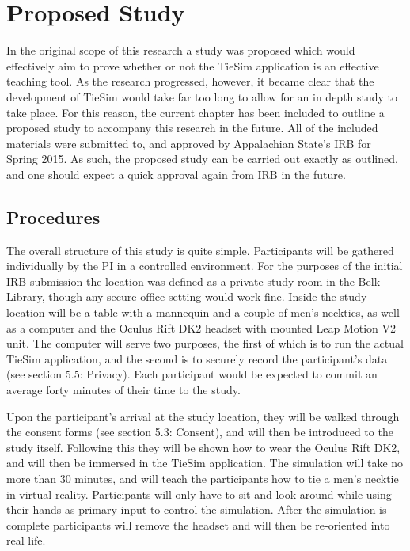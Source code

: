 \chapter{Proposed Study}
\label{chap:study}

In the original scope of this research a study was proposed which would effectively aim to prove whether or not the TieSim application is an effective teaching tool. As the research progressed, however, it became clear that the development of TieSim would take far too long to allow for an in depth study to take place. For this reason, the current chapter has been included to outline a proposed study to accompany this research in the future. All of the included materials were submitted to, and approved by Appalachian State's IRB for Spring 2015. As such, the proposed study can be carried out exactly as outlined, and one should expect a quick approval again from IRB in the future.

\section{Procedures}
\label{sec:procedures}

The overall structure of this study is quite simple. Participants will be gathered individually by the PI in a controlled environment. For the purposes of the initial IRB submission the location was defined as a private study room in the Belk Library, though any secure office setting would work fine. Inside the study location will be a table with a mannequin and a couple of men's neckties, as well as a computer and the Oculus Rift DK2 headset with mounted Leap Motion V2 unit. The computer will serve two purposes, the first of which is to run the actual TieSim application, and the second is to securely record the participant's data (see section 5.5: Privacy). Each participant would be expected to commit an average forty minutes of their time to the study. 

Upon the participant's arrival at the study location, they will be walked through the consent forms (see section 5.3: Consent), and will then be introduced to the study itself. Following this they will be shown how to wear the Oculus Rift DK2, and will then be immersed in the TieSim application. The simulation will take no more than 30 minutes, and will teach the participants how to tie a men's necktie in virtual reality. Participants will only have to sit and look around while using their hands as primary input to control the simulation. After the simulation is complete participants will remove the headset and will then be re-oriented into real life.

